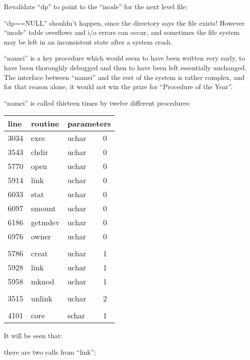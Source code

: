 \item[7664:] Revalidate ``dp'' to point  to  the
      ``inode'' for the next level file;

\item[7665:] ``dp==NULL''   shouldn't    happen,
since the directory says the file
exists!  However  ``inode''   table
overflows   and  i/o  errors  can
occur,  and  sometimes  the  file
system  may  be left in an inconsistent  state  after  a   system
crash.
\ed



``namei'' is a key procedure which  would
seem  to  have been written very early,
to have been  thoroughly  debugged  and
then  to  have  been  left  essentially
unchanged.   The   interface    between
``namei''  and  the rest of the system is
rather complex,  and  for  that  reason
alone,  it  would not win the prize for
``Procedure of the Year''.


``namei'' is  called  thirteen  times  by
twelve different procedures:

\begin{tabular}{llll}\\
{\bf line} & {\bf routine} & \multicolumn{2}{l}{\bf parameters} \\ \hline
3034 & exec & uchar & 0 \\
3543 & chdir & uchar & 0 \\
5770 & open & uchar & 0 \\
5914 & link & uchar & 0 \\
6033 & stat & uchar & 0 \\
6097 & smount & uchar & 0 \\
6186 & getmdev & uchar & 0 \\
6976 & owner & uchar & 0 \\
\\
5786 & creat & uchar & 1 \\
5928 & link & uchar & 1 \\
5958 & mknod & uchar & 1 \\
\\
3515 & unlink & uchar & 2 \\
\\
4101 & core & schar & 1 \\
\end{tabular}

\bigskip

\noindent It will be seen that:
\bd
\item[(a)] there are two calls from ``link'';

